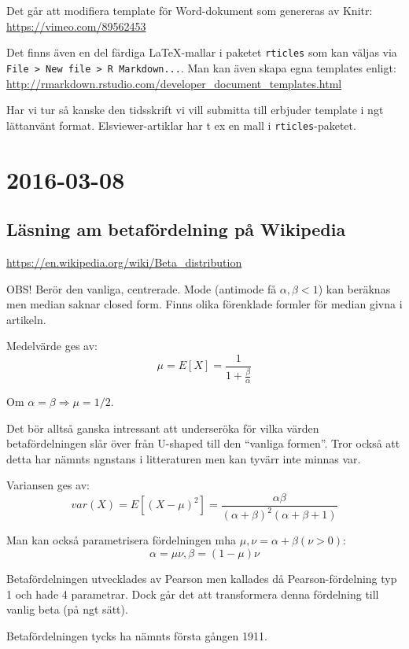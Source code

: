 \documentclass[]{article}
\begin{document}
Det går att modifiera template för Word-dokument som genereras av Knitr:
\url{https://vimeo.com/89562453}

Det finns även en del färdiga \LaTeX-mallar i paketet \texttt{rticles}
som kan väljas via
\texttt{File\ \textgreater{}\ New\ file\ \textgreater{}\ R\ Markdown...}.
Man kan även skapa egna templates enligt:
\url{http://rmarkdown.rstudio.com/developer_document_templates.html}

Har vi tur så kanske den tidsskrift vi vill submitta till erbjuder
template i ngt lättanvänt format. Elsviewer-artiklar har t ex en mall i
\texttt{rticles}-paketet.

\section{2016-03-08}\label{section-1}

\subsection{Läsning am betafördelning på
Wikipedia}\label{lasning-am-betafordelning-pa-wikipedia}

\url{https://en.wikipedia.org/wiki/Beta_distribution}

OBS! Berör den vanliga, centrerade. Mode (antimode få
\(\alpha, \beta < 1\)) kan beräknas men median saknar closed form. Finns
olika förenklade formler för median givna i artikeln.

Medelvärde ges av: \[\mu = E[X] = \frac{1}{1 + \frac{\beta}{\alpha}}\]

Om \(\alpha = \beta \Rightarrow \mu = 1/2\).

Det bör alltså ganska intressant att underseröka för vilka värden
betafördelningen slår över från U-shaped till den ``vanliga formen''.
Tror också att detta har nämnts ngnstans i litteraturen men kan tyvärr
inte minnas var.

Variansen ges av:
\[var(X) = E[(X-\mu)^2] = \frac{\alpha \beta}{(\alpha + \beta)^2(\alpha + \beta + 1)}\]

Man kan också parametrisera fördelningen mha
\(\mu, \nu = \alpha + \beta (\nu > 0)\):
\[\alpha = \mu \nu, \beta = (1 - \mu)\nu\]

Betafördelningen utvecklades av Pearson men kallades då
Pearson-fördelning typ 1 och hade 4 parametrar. Dock går det att
transformera denna fördelning till vanlig beta (på ngt sätt).

Betafördelningen tycks ha nämnts första gången 1911.
\end{document}
